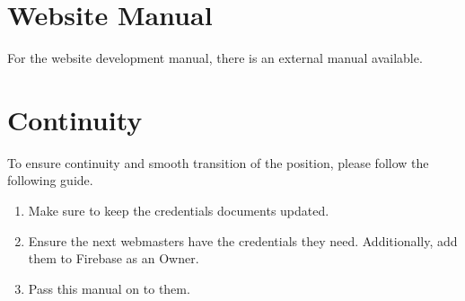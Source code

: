 \documentclass[a4paper]{article}
\begin{document}
\section{Website Manual}
For the website development manual, there is an external manual available.

\section{Continuity}
To ensure continuity and smooth transition of the position, please follow the following guide.
\begin{enumerate}
  \item Make sure to keep the credentials documents updated.
  \item Ensure the next webmasters have the credentials they need. Additionally, add them to Firebase as an Owner.
  \item Pass this manual on to them.
\end{enumerate}

\end{document}
